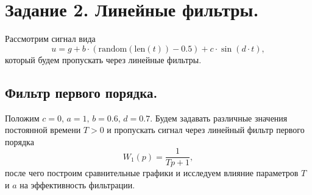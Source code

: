 \documentclass[a4paper, 12pt]{article}
\begin{document}
    \section{Задание 2. Линейные фильтры.}
    Рассмотрим сигнал вида $$u=g+b\cdot(\text{random}(\text{len}(t))-0.5) + c\cdot \sin(d\cdot t),$$ который будем пропускать
    через линейные фильтры.


    \subsection{Фильтр первого порядка.}
    Положим $c=0,\,a=1,\,b=0.6,\,d=0.7$. Будем задавать различные значения постоянной времени $T>0$ и пропускать сигнал через линейный
    фильтр первого порядка $$W_1(p)=\dfrac{1}{Tp+1},$$ после чего построим сравнительные графики и исследуем влияние параметров $T$ и $a$
    на эффективность фильтрации.
\end{document}
